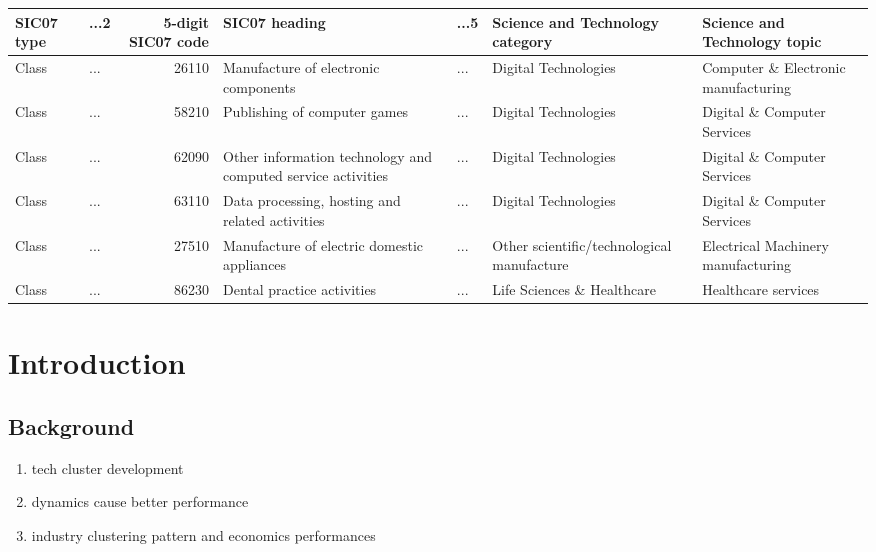 \documentclass[
  12pt,
  oneside]{book}
\providecommand{\tightlist}{%
  \setlength{\itemsep}{0pt}\setlength{\parskip}{0pt}}
\begin{document}
\begin{table}
\centering
\begin{tabular}{llrllll}
\toprule
\textbf{SIC07 type} & \textbf{...2} & \textbf{5-digit SIC07 code} & \textbf{SIC07 heading} & \textbf{...5} & \textbf{Science and Technology category} & \textbf{Science and Technology topic}\\
\midrule
Class & ... & 26110 & Manufacture of electronic components & ... & Digital Technologies & Computer \& Electronic manufacturing\\
Class & ... & 58210 & Publishing of computer games & ... & Digital Technologies & Digital \& Computer Services\\
Class & ... & 62090 & Other information technology and computed service activities & ... & Digital Technologies & Digital \& Computer Services\\
Class & ... & 63110 & Data processing, hosting and related activities & ... & Digital Technologies & Digital \& Computer Services\\
Class & ... & 27510 & Manufacture of electric domestic appliances & ... & Other scientific/technological manufacture & Electrical Machinery manufacturing\\
\addlinespace
Class & ... & 86230 & Dental practice activities & ... & Life Sciences \& Healthcare & Healthcare services\\
\bottomrule
\end{tabular}
\end{table}

\hypertarget{introduction}{%
\chapter{Introduction}\label{introduction}}


\hypertarget{background}{%
\section{Background}\label{background}}

\begin{enumerate}
\def\labelenumi{\arabic{enumi}.}
\tightlist
\item
  tech cluster development
\item
  dynamics cause better performance
\item
  industry clustering pattern and economics performances
\end{enumerate}
\end{document}
